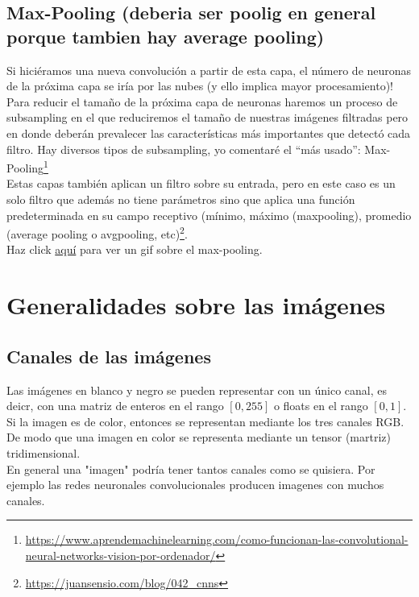 \documentclass{article}
\begin{document}
\subsection{Max-Pooling (deberia ser poolig en general porque tambien hay average pooling)}
Si hiciéramos una nueva convolución a partir de esta capa, el número de neuronas de la próxima capa se iría por las nubes (y ello implica mayor procesamiento)! Para reducir el tamaño de la próxima capa de neuronas haremos un proceso de subsampling en el que reduciremos el tamaño de nuestras imágenes filtradas pero en donde deberán prevalecer las características más importantes que detectó cada filtro. Hay diversos tipos de subsampling, yo comentaré el “más usado”: Max-Pooling\footnote{\url{https://www.aprendemachinelearning.com/como-funcionan-las-convolutional-neural-networks-vision-por-ordenador/}}\\

Estas capas también aplican un filtro sobre su entrada, pero en este caso es un solo filtro que además no tiene parámetros sino que aplica una función predeterminada en su campo receptivo (mínimo, máximo (maxpooling), promedio (average pooling o avgpooling, etc)\footnote{\url{https://juansensio.com/blog/042_cnns}}.\\

Haz click \href{https://miro.medium.com/max/1456/1*WvHC5bKyrHa7Wm3ca-pXtg.gif}{aquí} para ver un gif sobre el  max-pooling.

\section{Generalidades sobre las imágenes}

\subsection{Canales de las imágenes}
Las imágenes en blanco y negro se pueden representar con un único canal, es deicr, con una matriz de enteros en el rango $[0,255]$ o floats en el rango $[0,1]$.\\

Si la imagen es de color, entonces se representan mediante los tres canales RGB. De modo que una imagen en color se representa mediante un tensor (martriz) tridimensional.\\

En general una "imagen" podría tener tantos canales como se quisiera. Por ejemplo las redes neuronales convolucionales producen imagenes con muchos canales.
\end{document}
